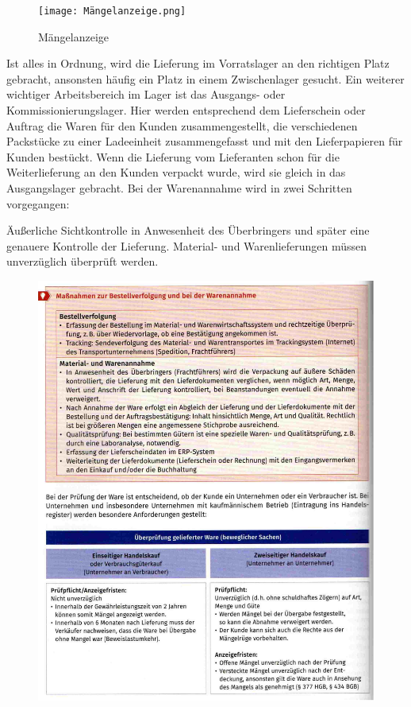 \documentclass[10pt]{article}
\begin{document}
\begin{figure}[H]
\begin{center}
  \texttt{[image: Mängelanzeige.png]}
  \end{center}
  \caption{Mängelanzeige}
  \label{fig:Mängelanzeige.png}
\end{figure}

Ist alles in Ordnung, wird die Lieferung im Vorratslager an den richtigen Platz gebracht, ansonsten häufig ein Platz in einem Zwischenlager gesucht. Ein weiterer wichtiger Arbeitsbereich im Lager ist das Ausgangs- oder Kommissionierungslager. Hier werden entsprechend dem Lieferschein oder Auftrag die Waren für den Kunden zusammengestellt, die verschiedenen Packstücke zu einer Ladeeinheit zusammengefasst und mit den Lieferpapieren für Kunden bestückt. Wenn die Lieferung vom Lieferanten schon für die Weiterlieferung an den Kunden verpackt wurde, wird sie gleich in das Ausgangslager gebracht. Bei der Warenannahme wird in zwei Schritten vorgegangen:

Äußerliche Sichtkontrolle in Anwesenheit des Überbringers und später eine genauere Kontrolle der Lieferung. Material- und Warenlieferungen müssen unverzüglich überprüft werden. 

\begin{figure}[H]
\begin{center}
  \includegraphics[width=12cm]{überprüfungWarenanahme.png}
  \end{center}
  \label{fig:überprüfungWarenanahme.png}
\end{figure} 
\end{document}
